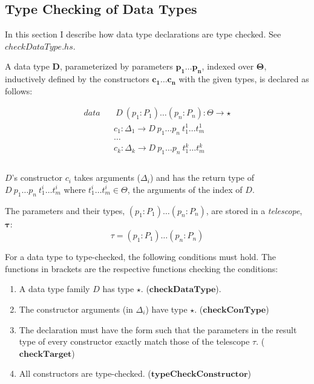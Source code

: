\documentclass[acmsmall]{acmart}
\begin{document}
\subsection{Type Checking of Data Types}

In this section I describe how data type declarations are type checked. See \emph{$checkDataType.hs$}.

A data type $\boldsymbol{D}$, parameterized by parameters $\boldsymbol{p_1 \dots p_n}$, indexed over $\boldsymbol{\Theta}$, inductively defined by the constructors $\boldsymbol{c_1 \dots c_n}$ with the given types, is declared as follows:

\begin{equation*}
  \begin{aligned}
    data &  & \: D \: (p_1:P_1) \dots (p_n:P_n) : \Theta \to \star       \\
         &  & c_1 : \Delta_1 \to D \: p_1 \dots p_n \: t_1^1 \dots t_m^1 \\
         &  & \dots                                                      \\
         &  & c_k : \Delta_k \to D \: p_1 \dots p_n \: t_1^k \dots t_m^k \\                                                           \\
  \end{aligned}
\end{equation*}

$D$'s constructor $c_i$ takes arguments ($\Delta_i$) and has the return type of $D \: p_1 \dots p_n \: t_1^i \dots t_m^i$ where $t_1^i \dots t_m^i \in \Theta$, the arguments of the index of $D$.

The parameters and their types, $(p_1:P_1) \dots (p_n:P_n)$, are stored in a \emph{telescope}, $\boldsymbol{\tau}$:
\begin{equation*}
  \tau = (p_1:P_1) \dots (p_n:P_n)  
\end{equation*}


For a data type to type-checked, the following conditions must hold. The functions in brackets are the respective functions checking the conditions:

\begin{enumerate}
  \item A data type family $D$ has type $\star$. ($\boldsymbol{checkDataType}$).
  \item The constructor arguments (in $\Delta_i$) have type $\star$. ($\boldsymbol{checkConType}$)
  \item The declaration must have the form such that the parameters in the result type of every constructor exactly match those of the telescope $\tau$. ($\boldsymbol{checkTarget}$)
  \item All constructors are type-checked. ($\boldsymbol{typeCheckConstructor}$)
\end{enumerate}
\end{document}
